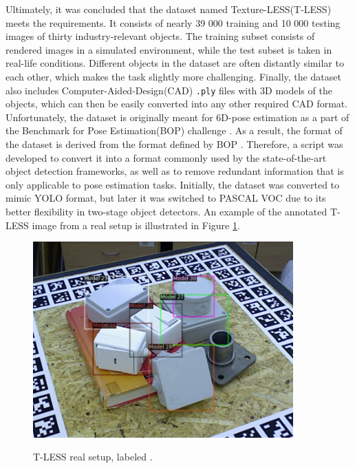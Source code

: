 \documentclass[english, 12pt, a4paper, elec, utf8, a-1b, online]{aaltothesis}
\begin{document}
Ultimately, it was concluded that the dataset named Texture-LESS(T-LESS)  \cite{hodan2017tless} meets the requirements. It consists of nearly 39 000 training and 10 000 testing images of thirty industry-relevant objects. The training subset consists of rendered images in a simulated environment, while the test subset is taken in real-life conditions.  Different objects in the dataset are often distantly similar to each other, which makes the task slightly more challenging. Finally, the dataset also includes Computer-Aided-Design(CAD) \texttt{.ply} files with 3D models of the objects, which can then be easily converted into any other required CAD format. Unfortunately, the dataset is originally meant for 6D-pose estimation \cite{hodan2017tless} as a part of the Benchmark for Pose Estimation(BOP) challenge \cite{hodan2018bop}. As a result, the format of the dataset is derived from the format defined by BOP  \cite{hodan2018bop_format}. Therefore, a script was developed to convert it into a format commonly used by the state-of-the-art object detection frameworks, as well as to remove redundant information that is only applicable to pose estimation tasks. Initially, the dataset was converted to mimic YOLO \cite{Redmon2015a} format, but later it was switched to PASCAL VOC due to its better flexibility in two-stage object detectors. An example of the annotated T-LESS image from a real setup is illustrated in Figure \ref{tless_real_example}. 

\begin{figure}[htb]
	\begin{center}
		\includegraphics[width=10cm]{./tless_real_annotated.png}
	\end{center}
	\caption{T-LESS real setup, labeled
\cite{hodan2017tless}.}
	\begin{center}
		\label{tless_real_example}
	\end{center}
\end{figure}
\FloatBarrier
\end{document}
